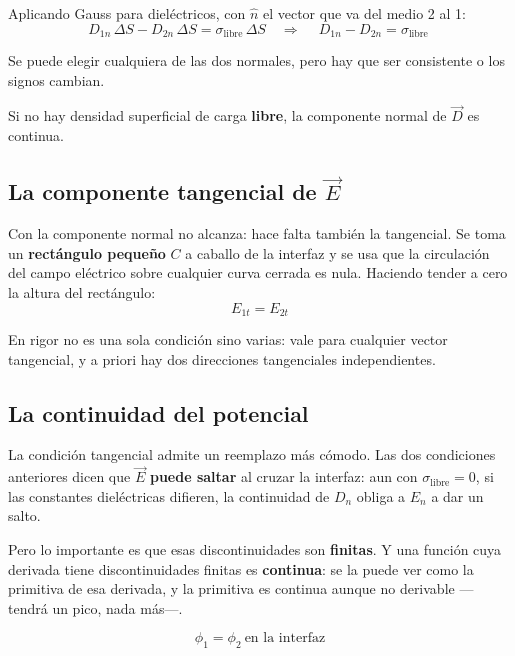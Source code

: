\documentclass[12pt,a4paper]{article}
\begin{document}
Aplicando Gauss para dieléctricos, con $\hat n$ el vector que va del medio 2 al 1:
\[
D_{1n}\,\Delta S - D_{2n}\,\Delta S = \sigma_{\text{libre}}\,\Delta S
\quad\Longrightarrow\quad
\boxed{\ D_{1n} - D_{2n} = \sigma_{\text{libre}}\ }
\]

\begin{warnbox}
Se puede elegir cualquiera de las dos normales, pero hay que ser consistente o
los signos cambian.
\end{warnbox}

Si no hay densidad superficial de carga \textbf{libre}, la componente normal de
$\vec D$ es continua.

\subsection{La componente tangencial de \texorpdfstring{$\vec E$}{E}}

Con la componente normal no alcanza: hace falta también la tangencial. Se toma un
\textbf{rectángulo pequeño} $C$ a caballo de la interfaz y se usa que la
circulación del campo eléctrico sobre cualquier curva cerrada es nula. Haciendo
tender a cero la altura del rectángulo:
\[
\boxed{\ E_{1t} = E_{2t}\ }
\]

En rigor no es una sola condición sino varias: vale para cualquier vector
tangencial, y a priori hay dos direcciones tangenciales independientes.

\subsection{La continuidad del potencial}

La condición tangencial admite un reemplazo más cómodo. Las dos condiciones
anteriores dicen que $\vec E$ \textbf{puede saltar} al cruzar la interfaz: aun
con $\sigma_{\text{libre}} = 0$, si las constantes dieléctricas difieren, la
continuidad de $D_n$ obliga a $E_n$ a dar un salto.

Pero lo importante es que esas discontinuidades son \textbf{finitas}. Y una
función cuya derivada tiene discontinuidades finitas es \textbf{continua}: se la
puede ver como la primitiva de esa derivada, y la primitiva es continua aunque no
derivable ---tendrá un pico, nada más---.

\begin{keybox}
\[
\boxed{\ \phi_1 = \phi_2 \ \text{en la interfaz}\ }
\]
\end{keybox}
\end{document}
